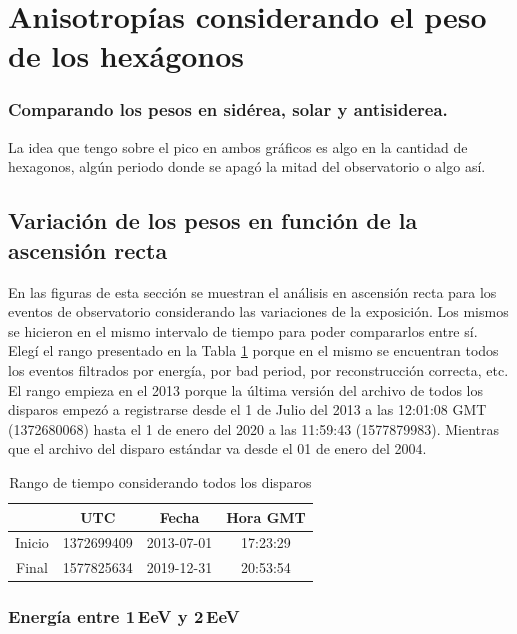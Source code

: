 
\section{Anisotropías  considerando el peso de los hexágonos}

\subsubsection{Comparando los pesos en sidérea, solar y antisiderea.}


La idea que tengo sobre el pico en ambos gráficos es algo en la cantidad de hexagonos, algún periodo donde se apagó la mitad del observatorio o algo así.



\subsection{Variación de los pesos en función de la ascensión recta}
En las figuras de esta sección se muestran el análisis en ascensión recta para los eventos de observatorio considerando las variaciones de la exposición. 
Los mismos se hicieron en el mismo intervalo de tiempo para poder compararlos entre sí. Elegí el rango presentado en la Tabla \ref{rango_corto}  porque en el mismo se encuentran todos los eventos filtrados por energía, por bad period, por reconstrucción correcta, etc. El rango empieza en el 2013 porque la última versión del archivo de todos los disparos empezó a registrarse desde el  1 de Julio del 2013 a las 12:01:08 GMT (1372680068) hasta el  1 de enero del 2020 a las 11:59:43 (1577879983). Mientras que el archivo del disparo estándar va desde el 01 de enero del 2004.

	\begin{table}[H]
	\centering
		\begin{tabular}{c|c|c|c}
	 		& UTC 			& Fecha		 	&  Hora GMT  \\ \hline
	Inicio	& 1372699409	&2013-07-01 	&17:23:29		\\
	Final 	& 1577825634	&2019-12-31 	&20:53:54		\\
		\end{tabular}
	\caption{Rango de tiempo considerando todos los disparos} 	\label{rango_corto}
	\end{table}


\subsubsection{Energía entre 1\,EeV y 2\,EeV}

